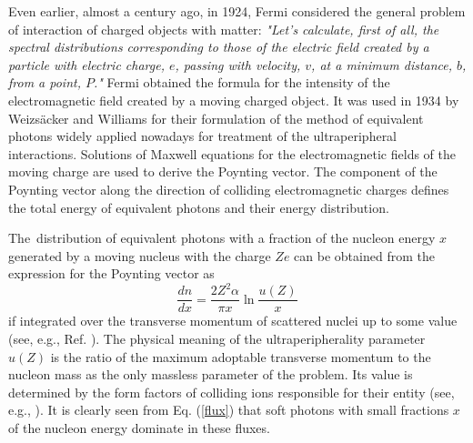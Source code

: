 \documentclass[12pt]{article}
\begin{document}
Even earlier, almost a century ago, in 1924, Fermi \cite{fer1, fer2} considered 
the general problem of interaction of charged objects with matter: 
{\it "Let's calculate, first of all, 
the spectral distributions corresponding to those of the electric field 
created by a particle with electric charge, $e$, passing with velocity, $v$, 
at a minimum distance, $b$, from a point, $P$."} Fermi obtained the formula for 
the intensity of the electromagnetic field created by a moving charged object. 
It was used in 1934 by Weizs\"acker \cite{wei} and Williams \cite{wil} for their 
formulation of the method of equivalent photons widely applied nowadays for 
treatment of the ultraperipheral interactions. Solutions of Maxwell equations
for the electromagnetic fields of the moving charge are used to derive
the Poynting vector. The component of the Poynting vector along the direction 
of colliding electromagnetic charges defines the total energy of equivalent 
photons and their energy distribution.

The~distribution of equivalent photons with a fraction of the nucleon energy
$x$ generated by a moving nucleus with the charge $Ze$ can be obtained 
from the expression for the Poynting vector as
\begin{equation}
\frac {dn}{dx}=\frac {2Z^2\alpha }{\pi x}\ln \frac {u(Z)}{x}
\label{flux}
\end{equation}
if integrated over the transverse momentum of scattered nuclei up to some value 
(see, e.g., Ref. \cite{blp}). The physical meaning of the ultraperipherality
parameter $u(Z)$ is the ratio of the maximum adoptable transverse momentum
to the nucleon mass as the only massless parameter of the problem.
Its value is determined by the form factors of colliding ions responsible
for their entity (see, e.g., \cite{vyzh}).
It is clearly seen from Eq. (\ref{flux}) that soft photons with small
fractions $x$ of the nucleon energy dominate in these fluxes.
\end{document}
